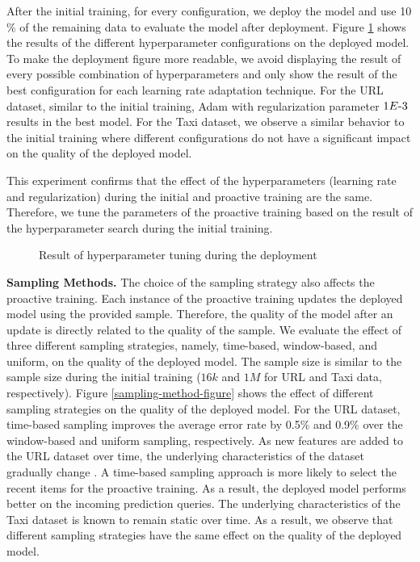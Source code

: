 After the initial training, for every configuration, we deploy the model and use 10 \% of the remaining data to evaluate the model after deployment.
Figure \ref{hyper-param-figure} shows the results of the different hyperparameter configurations on the deployed model.
To make the deployment figure more readable, we avoid displaying the result of every possible combination of hyperparameters and only show the result of the best configuration for each learning rate adaptation technique.
For the URL dataset, similar to the initial training, Adam with regularization parameter $1E{\text -}3$ results in the best model.
For the Taxi dataset, we observe a similar behavior to the initial training where different configurations do not have a significant impact on the quality of the deployed model.

This experiment confirms that the effect of the hyperparameters (learning rate and regularization) during the initial and proactive training are the same.
Therefore, we tune the parameters of the proactive training based on the result of the hyperparameter search during the initial training.
\begin{figure}[!h]
\centering
\resizebox{\columnwidth}{!}{}
\caption{Result of hyperparameter tuning during the deployment}
\label{hyper-param-figure}
\end{figure}

\textbf{Sampling Methods.}
The choice of the sampling strategy also affects the proactive training.
Each instance of the proactive training updates the deployed model using the provided sample.
Therefore, the quality of the model after an update is directly related to the quality of the sample.
We evaluate the effect of three different sampling strategies, namely, time-based, window-based, and uniform, on the quality of the deployed model.
The sample size is similar to the sample size during the initial training ($16k$ and $1M$ for URL and Taxi data, respectively).
Figure \ref{sampling-method-figure} shows the effect of different sampling strategies on the quality of the deployed model.
For the URL dataset, time-based sampling improves the average error rate by 0.5\% and 0.9\% over the window-based and uniform sampling, respectively.
As new features are added to the URL dataset over time, the underlying characteristics of the dataset gradually change \cite{ma2009identifying}.
A time-based sampling approach is more likely to select the recent items for the proactive training.
As a result, the deployed model performs better on the incoming prediction queries.
The underlying characteristics of the Taxi dataset is known to remain static over time.
As a result, we observe that different sampling strategies have the same effect on the quality of the deployed model.


